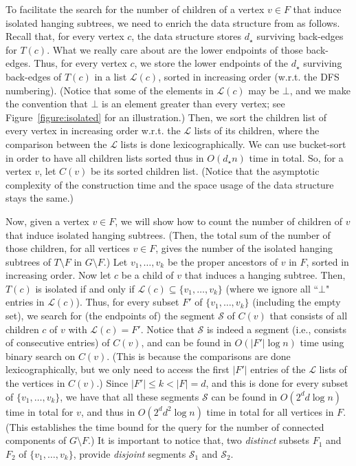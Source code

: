 \documentclass[11pt,a4paper]{article}
\begin{document}
To facilitate the search for the number of children of a vertex $v\in F$ that induce isolated hanging subtrees, we need to enrich the data structure from \cite{DBLP:conf/esa/Kosinas23} as follows. Recall that, for every vertex $c$, the data structure stores $d_{\star}$ surviving back-edges for $T(c)$. What we really care about are the lower endpoints of those back-edges. Thus, for every vertex $c$, we store the lower endpoints of the $d_{\star}$ surviving back-edges of $T(c)$ in a list $\mathcal{L}(c)$, sorted in increasing order (w.r.t. the DFS numbering). (Notice that some of the elements in $\mathcal{L}(c)$ may be $\bot$, and we make the convention that $\bot$ is an element greater than every vertex; see Figure~\ref{figure:isolated} for an illustration.) Then, we sort the children list of every vertex in increasing order w.r.t. the $\mathcal{L}$ lists of its children, where the comparison between the $\mathcal{L}$ lists is done lexicographically. We can use bucket-sort in order to have all children lists sorted thus in $O(d_{\star}n)$ time in total. So, for a vertex $v$, let $C(v)$ be its sorted children list. (Notice that the asymptotic complexity of the construction time and the space usage of the data structure stays the same.)

Now, given a vertex $v\in F$, we will show how to count the number of children of $v$ that induce isolated hanging subtrees. (Then, the total sum of the number of those children, for all vertices $v\in F$, gives the number of the isolated hanging subtrees of $T\setminus F$ in $G\setminus F$.) Let $v_1,\dots,v_k$ be the proper ancestors of $v$ in $F$, sorted in increasing order. Now let $c$ be a child of $v$ that induces a hanging subtree. Then, $T(c)$ is isolated if and only if $\mathcal{L}(c)\subseteq\{v_1,\dots,v_k\}$ (where we ignore all ``$\bot$" entries in $\mathcal{L}(c)$). Thus, for every subset $F'$ of $\{v_1,\dots,v_k\}$ (including the empty set), we search for (the endpoints of) the segment $\mathcal{S}$ of $C(v)$ that consists of all children $c$ of $v$ with $\mathcal{L}(c)=F'$. Notice that $\mathcal{S}$ is indeed a segment (i.e., consists of consecutive entries) of $C(v)$, and can be found in $O(|F'|\log n)$ time using binary search on $C(v)$. (This is because the comparisons are done lexicographically, but we only need to access the first $|F'|$ entries of the $\mathcal{L}$ lists of the vertices in $C(v)$.) Since $|F'|\leq k<|F|=d$, and this is done for every subset of $\{v_1,\dots,v_k\}$, we have that all these segments $\mathcal{S}$ can be found in $O(2^dd\log n)$ time in total for $v$, and thus in $O(2^dd^2\log n)$ time in total for all vertices in $F$. (This establishes the time bound for the query for the number of connected components of $G\setminus F$.) It is important to notice that, two \emph{distinct} subsets $F_1$ and $F_2$ of $\{v_1,\dots,v_k\}$, provide \emph{disjoint} segments $\mathcal{S}_1$ and $\mathcal{S}_2$.
\end{document}

